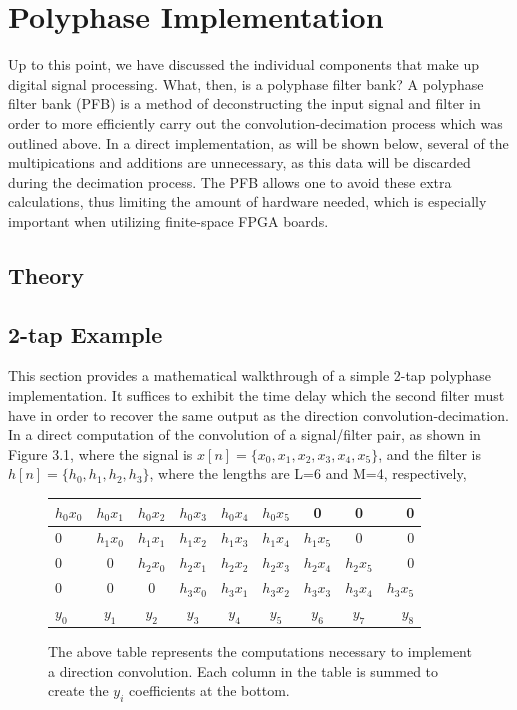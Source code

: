 \documentclass{report}
\begin{document}
\chapter{Polyphase Implementation}

Up to this point, we have discussed the individual components that make up digital signal processing.  What, then, is a polyphase filter bank?  A polyphase filter bank (PFB) is a method of deconstructing the input signal and filter in order to more efficiently carry out the convolution-decimation process which was outlined above.  In a direct implementation, as will be shown below, several of the multipications and additions are unnecessary, as this data will be discarded during the decimation process.  The PFB allows one to avoid these extra calculations, thus limiting the amount of hardware needed, which is especially important when utilizing finite-space FPGA boards.

\section{Theory}

\section{2-tap Example}
This section provides a mathematical walkthrough of a simple 2-tap polyphase implementation.  It suffices to exhibit the time delay which the second filter must have in order to recover the same output as the direction convolution-decimation. 
In a direct computation of the convolution of a signal/filter pair, as shown in Figure 3.1, where the signal is $x[n] = \{x_0, x_1, x_2, x_3, x_4, x_5\}$, and the filter is $h[n] = \{h_0, h_1, h_2, h_3\}$, where the lengths are L=6 and M=4, respectively,
\bigskip
\begin{figure}[ht]
\begin{center}
  \begin{tabular}{ l|c|c|c|c|c|c|c|r }
    \hline
    $h_0 x_0$ & $h_0 x_1$ & $h_0 x_2$ & $h_0 x_3$ & $h_0 x_4$ & $h_0 x_5$ & 0 & 0 & 0\\ \hline
    0 & $h_1 x_0$ & $h_1 x_1$ & $h_1 x_2$ & $h_1 x_3$ & $h_1 x_4$ & $h_1 x_5$ & 0 & 0\\ \hline
    0 & 0 &$h_2 x_0$ & $h_2 x_1$ & $h_2 x_2$ & $h_2 x_3$ & $h_2 x_4$ & $h_2 x_5$ & 0\\ \hline
    0 & 0 & 0 &$h_3 x_0$ & $h_3 x_1$ & $h_3 x_2$ & $h_3 x_3$ & $h_3 x_4$ & $h_3 x_5$ \\\Xhline{1pt}
    $y_0$ & $y_1$ & $y_2$ & $y_3$ & $y_4$ & $y_5$ & $y_6$ & $y_7$ & $y_8$\\ \hline
  \end{tabular}
\end{center}
\caption{The above table represents the computations necessary to implement a direction convolution.  Each column in the table is summed to create the $y_i$ coefficients at the bottom.}
\end{figure}
\end{document}
